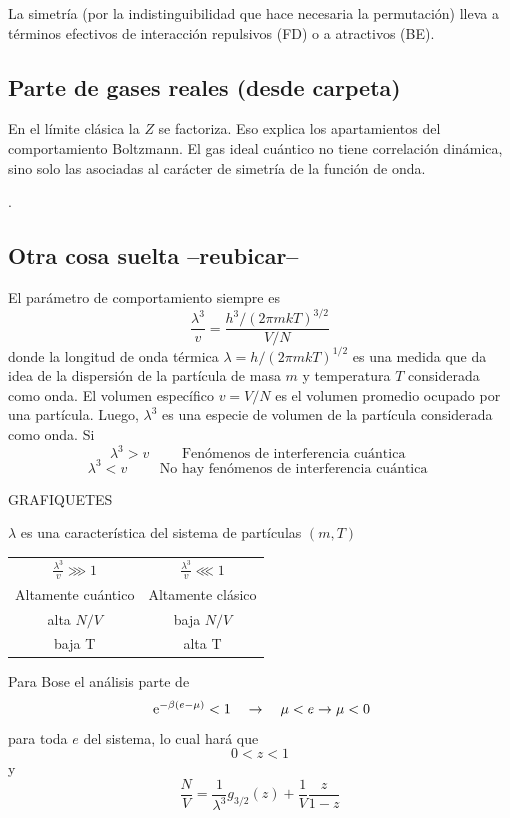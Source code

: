 \documentclass[10pt,oneside]{CBFT_book}
\begin{document}
La simetría (por la indistinguibilidad que hace necesaria la permutación) lleva a términos efectivos de interacción 
repulsivos (FD) o a atractivos (BE).

\subsection{Parte de gases reales (desde carpeta)}

En el límite clásica la $Z$ se factoriza.
Eso explica los apartamientos del comportamiento Boltzmann. El gas ideal cuántico no tiene correlación dinámica,
sino solo las asociadas al carácter de simetría de la función de onda.

.


\subsection{Otra cosa suelta --reubicar--}

El parámetro de comportamiento siempre es
\[
	\frac{\lambda^3}{v} = \frac{h^3/(2\pi m kT)^{3/2}}{V/N}
\]
donde la longitud de onda térmica $\lambda = h/(2\pi m kT)^{1/2}$ es una medida que da idea de la dispersión de la 
partícula de masa $m$ y temperatura $T$ considerada como onda. El volumen específico $v=V/N$ es el volumen promedio 
ocupado por una partícula. Luego, $\lambda^3$ es una especie de volumen de la partícula considerada como onda.
Si 
\[
	\lambda^3 > v \qquad \text{ Fenómenos de interferencia cuántica }
\]
\[
	\lambda^3 < v \qquad \text{ No hay fenómenos de interferencia cuántica }
\]

GRAFIQUETES

$\lambda$ es una característica del sistema de partículas $(m,T)$
\begin{center}
\begin{tabular}{c c}
$\displaystyle \frac{\lambda^3}{v} \ggg 1 $ & $\displaystyle \frac{\lambda^3}{v} \lll 1 $ \\
Altamente cuántico &  Altamente clásico\\
alta $N/V$ & baja $N/V$\\
baja T & alta T
\end{tabular}
\end{center}

Para Bose el análisis parte de 
\[
	\:\mathrm{e}^{-\beta(e-\mu)} < 1 \quad \rightarrow \quad \mu < e \to \mu < 0
\]
para toda $e$ del sistema, lo cual hará que 
\[
	0 < z < 1 
\]
y
\[
	\frac{N}{V} = \frac{1}{\lambda^3} g_{3/2}(z) + \frac{1}{V} \frac{z}{1-z}
\]
\end{document}
